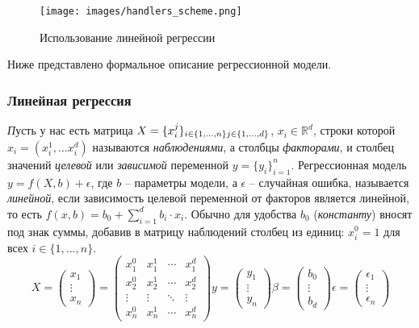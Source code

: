 \documentclass[12pt]{article}
\begin{document}
\begin{figure}[t]
\centering
\texttt{[image: images/handlers\_scheme.png]}
\caption{Использование линейной регрессии}
\label{fig:handlers_scheme}
\end{figure}

\indent Ниже представлено формальное описание регрессионной модели.

\subsubsection{Линейная регрессия}
\indent \textit Пусть у нас есть матрица $X = \{x_i^j\}_{i \in \{1, ..., n\} \\ j \in \{1, ..., d\}}$, $x_i\in\mathbb{R}^{d}$, строки которой $x_i = (x_i^1, ... x_i^d)$ называются \textit{наблюдениями}, а столбцы \textit{факторами}, и столбец значений \textit{целевой} или \textit{зависимой} переменной $y = \{y_i\}_{i=1}^n$. Регрессионная модель $y = f(X, b) + \epsilon$, где $b$ -- параметры модели, а $\epsilon$ -- случайная ошибка, называется \textit{линейной}, если зависимость целевой переменной от факторов является линейной, то есть $f(x, b) = b_0 + \sum_{i=1}^{d} b_i \cdot x_i$. Обычно для удобства $b_0$ (\textit{константу}) вносят под знак суммы, добавив в матрицу наблюдений столбец из единиц: $x_i^0 = 1$ для всех $i \in \{1, ..., n\}$. 
$$X = \left(\begin{array}{c}
      x_1 \\
      \vdots \\
      x_n
    \end{array}
  \right) 
  = 
  \begin{pmatrix} x_1^0 & x_1^1 & \cdots & x_1^d \\
                      x_2^0 & x_2^1 & \cdots & x_2^d \\
                      \vdots & \vdots & \ddots & \vdots \\
                      x_n^0 & x_n^1 & \cdots & x_n^d \end{pmatrix}
y = \left(\begin{array}{c}
      y_1 \\
      \vdots \\
      y_n
    \end{array}
  \right)
\beta = \left(\begin{array}{c}
      b_0 \\
      \vdots \\
      b_d
    \end{array}
  \right)
\epsilon = \left(\begin{array}{c}
      \epsilon_1 \\
      \vdots \\
      \epsilon_n
    \end{array}
  \right)$$
\end{document}
